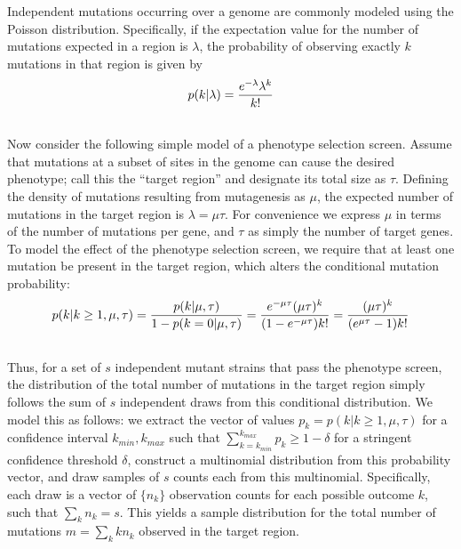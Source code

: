 \documentclass[letterpaper,10pt,english]{howto}
\begin{document}
Independent mutations occurring over a genome are commonly modeled
using the Poisson distribution.  Specifically, if the expectation value
for the number of mutations expected in a region is $\lambda$,
the probability of observing exactly $k$ mutations in that region is
given by
\begin{gather}
\begin{split}p(k|\lambda) = \frac{e^{-\lambda}\lambda^k}{k!}\end{split}\notag\\\begin{split}\end{split}\notag
\end{gather}
Now consider the following simple model of a phenotype selection screen.
Assume that mutations at a subset of sites in the genome can cause
the desired phenotype; call this the ``target region'' and
designate its total size as $\tau$.  Defining the density of
mutations resulting from mutagenesis as $\mu$, the expected
number of mutations in the target region is $\lambda=\mu\tau$.
For convenience we express $\mu$ in terms of the number of
mutations per gene, and $\tau$ as simply the number of target genes.
To model the effect of the phenotype selection screen, we require
that at least one mutation be present in the target region,
which alters the conditional mutation probability:
\begin{gather}
\begin{split}p(k|k \ge 1, \mu,\tau) = \frac{p(k|\mu,\tau)}{1-p(k=0|\mu,\tau)}
= \frac{e^{-\mu\tau}(\mu\tau)^k}{(1-e^{-\mu\tau})k!}
= \frac{(\mu\tau)^k}{(e^{\mu\tau}-1)k!}\end{split}\notag\\\begin{split}\end{split}\notag
\end{gather}
Thus, for a set of $s$ independent mutant strains that pass
the phenotype screen, the distribution of the
total number of mutations in the target region simply follows
the sum of $s$ independent draws from this conditional
distribution.  We model this as follows: we extract the vector
of values $p_k = p(k|k \ge 1, \mu,\tau)$
for a confidence interval $k_{min},k_{max}$ such that
$\sum_{k=k_{min}}^{k_{max}}{p_k} \ge 1-\delta$
for a stringent confidence threshold $\delta$,
construct a multinomial
distribution from this probability vector, and draw samples
of $s$ counts each from this multinomial.  Specifically,
each draw is a vector of $\{n_k\}$ observation counts for
each possible outcome $k$, such that $\sum_k{n_k}=s$.
This yields a sample distribution for the total number of mutations
$m=\sum_k{kn_k}$ observed in the target region.
\end{document}
